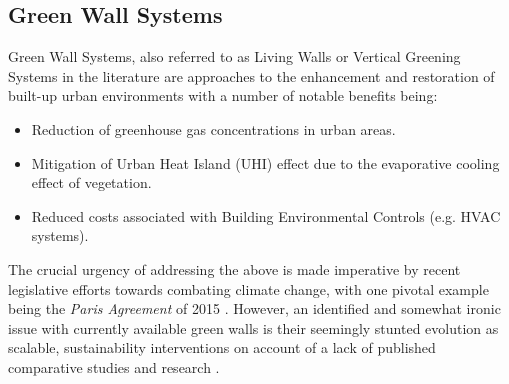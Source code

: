 \documentclass{report}
\begin{document}
\subsection{Green Wall Systems}
Green Wall Systems, also referred to as Living Walls \cite{Sheweka2011} or Vertical Greening Systems \cite{Manso2015} in the literature are approaches to the enhancement and restoration of built-up urban environments with a number of notable benefits being:
\begin{itemize}
	\item Reduction of greenhouse gas concentrations in urban areas.
	\item Mitigation of Urban Heat Island (UHI) effect due to the evaporative cooling effect of vegetation.
	\item Reduced costs associated with Building Environmental Controls (e.g. HVAC systems).
\end{itemize}

The crucial urgency of addressing the above is made imperative by recent legislative efforts towards combating climate change, with one pivotal example being the \textit{Paris Agreement} of 2015 \cite{UNFCCC2015}. However, an identified and somewhat ironic issue with currently available green walls is their seemingly stunted evolution as scalable, sustainability interventions on account of a lack of published comparative studies and research \cite{Manso2015} \cite{Kalantari2017}.
\end{document}
